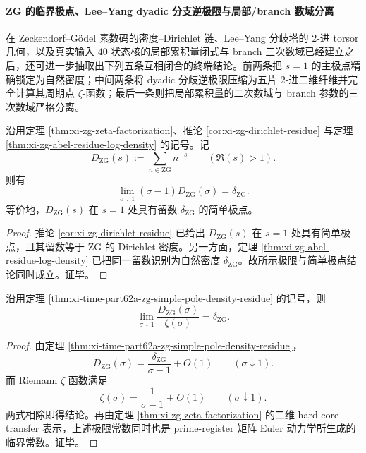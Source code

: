 \paragraph{ZG 的临界极点、Lee--Yang dyadic 分支逆极限与局部/branch 数域分离}
在 Zeckendorf--Gödel 素数码的密度--Dirichlet 链、Lee--Yang 分歧塔的 \(2\)-进 torsor 几何，以及真实输入 \(40\) 状态核的局部累积量闭式与 branch 三次数域已经建立之后，还可进一步抽取出下列五条互相闭合的终端结论。前两条把 \(s=1\) 的主极点精确锁定为自然密度；中间两条将 dyadic 分歧逆极限压缩为五片 \(2\)-进二维纤维并完全计算其周期点 \(\zeta\)-函数；最后一条则把局部累积量的二次数域与 branch 参数的三次数域严格分离。

\begin{theorem}[Zeckendorf--Gödel Dirichlet 级数在 \texorpdfstring{$s=1$}{s=1} 的简单极点与自然密度留数]\label{thm:xi-time-part62a-zg-simple-pole-density-residue}
沿用定理 \ref{thm:xi-zg-zeta-factorization}、推论 \ref{cor:xi-zg-dirichlet-residue} 与定理 \ref{thm:xi-zg-abel-residue-log-density} 的记号。记
\[
D_{\mathrm{ZG}}(s):=\sum_{n\in\mathrm{ZG}}n^{-s}
\qquad (\Re(s)>1).
\]
则有
\[
\boxed{\;
\lim_{\sigma\downarrow 1}(\sigma-1)D_{\mathrm{ZG}}(\sigma)=\delta_{\mathrm{ZG}}.
\;}
\]
等价地，\(D_{\mathrm{ZG}}(s)\) 在 \(s=1\) 处具有留数 \(\delta_{\mathrm{ZG}}\) 的简单极点。
\end{theorem}
\begin{proof}
推论 \ref{cor:xi-zg-dirichlet-residue} 已给出 \(D_{\mathrm{ZG}}(s)\) 在 \(s=1\) 处具有简单极点，且其留数等于 \(\mathrm{ZG}\) 的 Dirichlet 密度。另一方面，定理 \ref{thm:xi-zg-abel-residue-log-density} 已把同一留数识别为自然密度 \(\delta_{\mathrm{ZG}}\)。故所示极限与简单极点结论同时成立。证毕。
\end{proof}

\begin{corollary}\label{cor:xi-time-part62a-zg-zeta-normalized-density-limit}
沿用定理 \ref{thm:xi-time-part62a-zg-simple-pole-density-residue} 的记号，则
\[
\boxed{\;
\lim_{\sigma\downarrow 1}\frac{D_{\mathrm{ZG}}(\sigma)}{\zeta(\sigma)}
=
\delta_{\mathrm{ZG}}.
\;}
\]
\end{corollary}
\begin{proof}
由定理 \ref{thm:xi-time-part62a-zg-simple-pole-density-residue}，
\[
D_{\mathrm{ZG}}(\sigma)=\frac{\delta_{\mathrm{ZG}}}{\sigma-1}+O(1)
\qquad (\sigma\downarrow 1).
\]
而 Riemann \(\zeta\) 函数满足
\[
\zeta(\sigma)=\frac{1}{\sigma-1}+O(1)
\qquad (\sigma\downarrow 1).
\]
两式相除即得结论。再由定理 \ref{thm:xi-zg-zeta-factorization} 的二维 hard-core transfer 表示，上述极限常数同时也是 prime-register 矩阵 Euler 动力学所生成的临界常数。证毕。
\end{proof}

